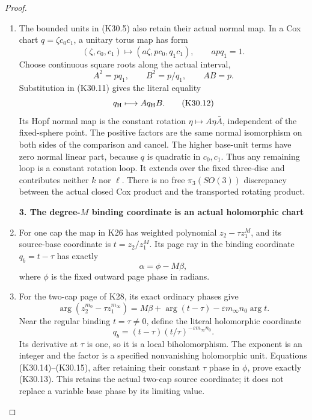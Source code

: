 \begin{proof}
\begin{enumerate}[label=\arabic*.]
\item The bounded units in (K30.5) also retain their actual normal
map. In a Cox chart \(q=\zeta c_0c_1\), a unitary torus map
has form
\[
 (\zeta,c_0,c_1)\longmapsto
       (a\zeta,p c_0,q_1c_1),\qquad apq_1=1.
\]
Choose continuous square roots along the actual interval,
\[
             A^2=pq_1,\qquad B^2=p/q_1,\qquad AB=p.
\]
Substitution in (K30.11) gives the literal equality
\[
                         q_{\rm H}\longmapsto A q_{\rm H}B .
 \tag{K30.12}
\]
Its Hopf normal map is the constant rotation
\(\eta\mapsto A\eta\bar A\), independent of the fixed-sphere
point. The positive factors are the same normal isomorphism
on both sides of the comparison and cancel. The higher
base-unit terms have zero normal linear part, because \(q\)
is quadratic in \(c_0,c_1\). Thus any remaining loop is a
constant rotation loop. It extends over the fixed three-disc
and contributes neither \(k\) nor \(\ell\). There is no
free \(\pi_3(SO(3))\) discrepancy between the actual closed
Cox product and the transported rotating product.

\par

\medskip\noindent\textbf{3. The degree-\(M\) binding coordinate is an actual holomorphic chart}

\par\nobreak

\item For one cap the map in K26 has weighted polynomial
\(z_2-\tau z_1^M\), and its source-base coordinate is
\(t=z_2/z_1^M\). Its page ray in the binding coordinate
\(q_b=t-\tau\) has exactly
\[
                            \alpha=\phi-M\beta,
 \tag{K30.13}
\]
where \(\phi\) is the fixed outward page phase in radians.

\item For the two-cap page of K28, its exact ordinary phases give
\[
 \arg(z_2^{m_0}-\tau z_1^{m_\infty})
       =M\beta+\arg(t-\tau)-\varepsilon m_\infty n_0\arg t .
 \tag{K30.14}
\]
Near the regular binding \(t=\tau\ne0\), define the literal
holomorphic coordinate
\[
              q_b=(t-\tau)(t/\tau)^{-\varepsilon m_\infty n_0}.
 \tag{K30.15}
\]
Its derivative at \(\tau\) is one, so it is a local
biholomorphism. The exponent is an integer and the factor is
a specified nonvanishing holomorphic unit. Equations
(K30.14)--(K30.15), after retaining their constant \(\tau\)
phase in \(\phi\), prove exactly (K30.13).
This retains the actual two-cap source coordinate; it does
not replace a variable base phase by its limiting value.


\end{enumerate}
\end{proof}
